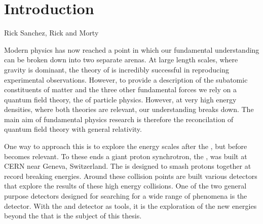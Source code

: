 \chapter{Introduction}
\label{chap:introduction}



{Rick Sanchez, Rick and Morty}


Modern physics has now reached a point in which our fundamental
understanding can be broken down into two separate arenas. At large
length scales, where gravity is dominant, the theory of \GR is
incredibly successful in reproducing experimental observations.
However, to provide a description of the subatomic constituents of
matter and the three other fundamental forces we rely on a quantum
field theory, the \SM of particle physics. However, at very high
energy densities, where both theories are relevant, our understanding
breaks down. The main aim of fundamental physics research is therefore
the reconcilation of quantum field theory with general relativity. 

One way to approach this is to explore the energy scales after the
\SM, but before \GR becomes relevant. To these ends a giant proton
synchrotron, the \LHC, was built at CERN near Geneva, Switzerland. The
\LHC is designed to smash protons together at record breaking
energies. Around these collision points are built various detectors
that explore the results of these high energy collisions. One of the
two general purpose detectors designed for searching for a wide range
of phenomena is the \CMS detector. With the \LHC and \CMS detector as
tools, it is the exploration of the new energies beyond the \SM that
is the subject of this thesis.

